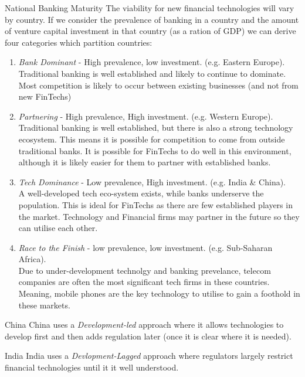 \documentclass[11pt,a4paper]{article}
\begin{document}
  \begin{proposition}{National Banking Maturity}
    The viability for new financial technologies will vary by country. If we consider the prevalence of banking in a country and the amount of venture capital investment in that country (as a ration of GDP) we can derive four categories which partition countries:
    \begin{enumerate}
      \item \textit{Bank Dominant} - High prevalence, low investment. (e.g. Eastern Europe).\\
      Traditional banking is well established and likely to continue to dominate. Most competition is likely to occur between existing businesses (and not from new FinTechs)
      \item \textit{Partnering} - High prevalence, High investment. (e.g. Western Europe).\\
      Traditional banking is well established, but there is also a strong technology ecosystem. This means it is possible for competition to come from outside traditional banks. It is possible for FinTechs to do well in this environment, although it is likely easier for them to partner with established banks.
      \item \textit{Tech Dominance} - Low prevalence, High investment. (e.g. India \& China).\\
      A well-developed tech eco-system exists, while banks underserve the population. This is ideal for FinTechs as there are few established players in the market. Technology and Financial firms may partner in the future so they can utilise each other.
      \item \textit{Race to the Finish} - low prevalence, low investment. (e.g. Sub-Saharan Africa).\\
      Due to under-development technolgy and banking prevelance, telecom companies are often the most significant tech firms in these countries. Meaning, mobile phones are the key technology to utilise to gain a foothold in these markets.
    \end{enumerate}
  \end{proposition}

  \begin{remark}{China}
    China uses a \textit{Development-led} approach where it allows technologies to develop first and then adds regulation later (once it is clear where it is needed).
  \end{remark}

  \begin{remark}{India}
    India uses a \textit{Devlopment-Lagged} approach where regulators largely restrict financial technologies until it it well understood.
  \end{remark}
\end{document}
